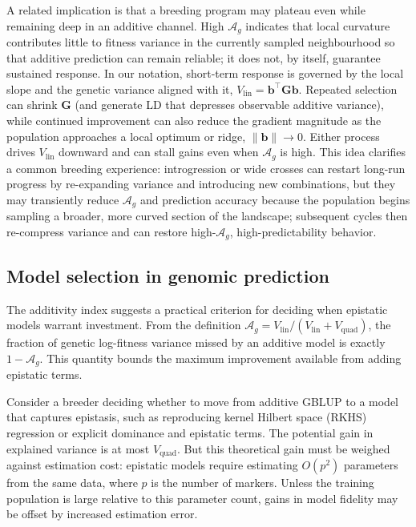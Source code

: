 \documentclass[9pt,twocolumn,twoside,lineno]{gsajnl}
\newcommand{\vect}[1]{\boldsymbol{#1}}
\newcommand{\mat}[1]{\mathbf{#1}}
\newcommand{\Ag}{\ensuremath{\mathcal{A}_{g}}\xspace}
\newcommand{\Vlin}{\ensuremath{V_{\text{lin}}}\xspace}
\begin{document}
A related implication is that a breeding program may plateau even while remaining deep in an additive channel. High \Ag indicates that local curvature contributes little to fitness variance in the currently sampled neighbourhood so that additive prediction can remain reliable; it does not, by itself, guarantee sustained response. In our notation, short-term response is governed by the local slope and the genetic variance aligned with it, $\Vlin=\vect{b}^\top\mat{G}\vect{b}$. Repeated selection can shrink $\mat{G}$ (and generate LD that depresses observable additive variance), while continued improvement can also reduce the gradient magnitude as the population approaches a local optimum or ridge, $\|\vect{b}\|\to 0$. Either process drives $\Vlin$ downward and can stall gains even when \Ag is high. This idea clarifies a common breeding experience: introgression or wide crosses can restart long-run progress by re-expanding variance and introducing new combinations, but they may transiently reduce \Ag and prediction accuracy because the population begins sampling a broader, more curved section of the landscape; subsequent cycles then re-compress variance and can restore high-\Ag, high-predictability behavior.


\subsection*{Model selection in genomic prediction}

The additivity index suggests a practical criterion for deciding when epistatic models warrant investment. From the definition $\mathcal{A}_g = V_{\text{lin}}/(V_{\text{lin}} + V_{\text{quad}})$, the fraction of genetic log-fitness variance missed by an additive model is exactly $1 - \mathcal{A}_g$. This quantity bounds the maximum improvement available from adding epistatic terms.

Consider a breeder deciding whether to move from additive GBLUP to a model that captures epistasis, such as reproducing kernel Hilbert space (RKHS) regression or explicit dominance and epistatic terms. The potential gain in explained variance is at most $V_{\text{quad}}$. But this theoretical gain must be weighed against estimation cost: epistatic models require estimating $O(p^2)$ parameters from the same data, where $p$ is the number of markers. Unless the training population is large relative to this parameter count, gains in model fidelity may be offset by increased estimation error.
\end{document}
